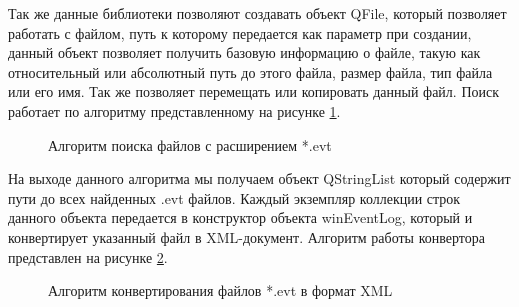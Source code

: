 Так же данные библиотеки позволяют создавать объект QFile, который позволяет работать с файлом, путь к которому передается как параметр при создании, данный объект позволяет получить базовую информацию о файле, такую как относительный или абсолютный путь до этого файла, размер файла, тип файла или его имя. Так же позволяет перемещать или копировать данный файл. Поиск работает по алгоритму представленному на рисунке \ref{evtsearch:evtSearch}.

\begin{figure}[ht]
\caption{Алгоритм поиска файлов с расширением *.evt}
\label{evtsearch:evtSearch}
\end{figure}

На выходе данного алгоритма мы получаем объект QStringList который содержит пути до всех найденных .evt файлов. Каждый экземпляр коллекции строк данного объекта передается в конструктор объекта winEventLog, который и конвертирует указанный файл в XML-документ. Алгоритм работы конвертора представлен на рисунке \ref{evtxml:evtToXML}.

\begin{figure}[ht]
\caption{Алгоритм конвертирования файлов *.evt в формат XML}
\label{evtxml:evtToXML}
\end{figure}

